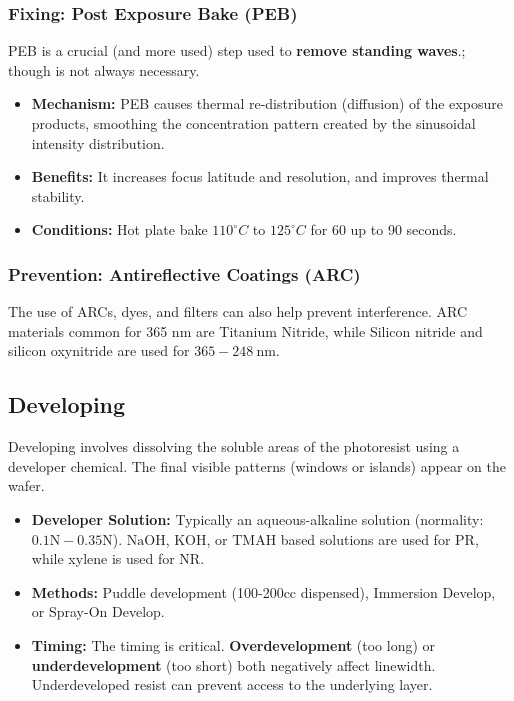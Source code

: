 \documentclass{report}
\begin{document}
\subsubsection{Fixing: Post Exposure Bake (PEB)} PEB is a crucial (and more used) step used to \textbf{remove standing waves}.; though is not always necessary. 
\begin{itemize} 
    \item \textbf{Mechanism:} PEB causes thermal re-distribution (diffusion) of the exposure products, smoothing the concentration pattern created by the sinusoidal intensity distribution. 
    \item \textbf{Benefits:} It increases focus latitude and resolution, and improves thermal stability. 
    \item \textbf{Conditions:} Hot plate bake $110^{\circ}C$ to $125^{\circ}C$ for 60 up to 90 seconds. 
\end{itemize}
\subsubsection{Prevention: Antireflective Coatings (ARC)} The use of ARCs, dyes, and filters can also help prevent interference. ARC materials common for 365 nm are Titanium Nitride, while Silicon nitride and silicon oxynitride are used for $365-248~\text{nm}$.
\subsection{Developing}
Developing involves dissolving the soluble areas of the photoresist using a developer chemical. The final visible patterns (windows or islands) appear on the wafer.
\begin{itemize} 
    \item \textbf{Developer Solution:} Typically an aqueous-alkaline solution (normality: $0.1\text{N} - 0.35\text{N}$). $\text{NaOH}$, $\text{KOH}$, or $\text{TMAH}$ based solutions are used for PR, while xylene is used for NR. 
    \item \textbf{Methods:} Puddle development (100-200cc dispensed), Immersion Develop, or Spray-On Develop. 
    \item \textbf{Timing:} The timing is critical. \textbf{Overdevelopment} (too long) or \textbf{underdevelopment} (too short) both negatively affect linewidth. Underdeveloped resist can prevent access to the underlying layer. 
\end{itemize}
\end{document}
